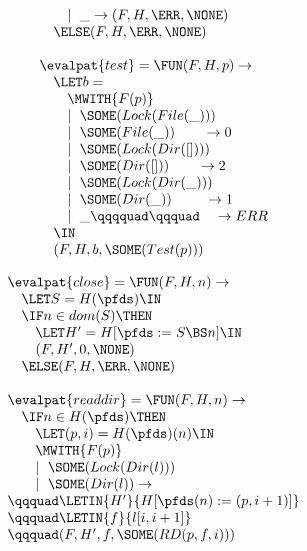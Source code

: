 \begin{figure*}
\begin{minipage}[t]{0.5\linewidth}
\begin{displaymath}
\begin{array}{l}
\qquad \mid~\_  \rightarrow (F,H,\ERR,\NONE) \\
\quad \ELSE (F,H,\ERR,\NONE) \\
\\
\evalpat{test} = \FUN (F,H,p) \rightarrow \\
\quad \LET b = \\
\qquad \MWITH{F(p)} \\
\qquad \mid~\SOME(Lock(File(\_))) \\
\qquad \mid~\SOME(File(\_)) \qquad \rightarrow 0 \\
\qquad \mid~\SOME(Lock(Dir([]))) \\
\qquad \mid~\SOME(Dir([])) \qquad \rightarrow 2 \\
\qquad \mid~\SOME(Lock(Dir(\_))) \\
\qquad \mid~\SOME(Dir(\_)) \qquad ~ \rightarrow 1 \\
\qquad  \mid~\_ \qqqquad \qqquad ~~~ \rightarrow ERR \\
\quad \IN \\
\quad (F,H,b,\SOME(Test(p)))
\end{array}
\end{displaymath}
\end{minipage}
\hfill
\begin{minipage}[t]{0.5\linewidth}
\begin{displaymath}
\begin{array}{l}
\evalpat{close} = \FUN (F,H,n) \rightarrow \\
\quad \LET S = H(\pfds) \IN \\
\quad \IF n \in dom(S) \THEN \\
\qquad \LET H' = H[\pfds := S \BS n] \IN \\
\qquad (F,H',0,\NONE) \\
\quad \ELSE (F,H,\ERR,\NONE) \\
\\
\evalpat{readdir} = \FUN (F,H,n) \rightarrow \\
\quad \IF n \in H(\pfds) \THEN \\
\qquad \LET (p,i) = H(\pfds)(n) \IN \\
\qquad \MWITH{F(p)} \\
\qquad \mid~\SOME(Lock(Dir(l))) \\
\qquad \mid~\SOME(Dir(l)) \rightarrow \\
\qqquad \LETIN{H'}{H[\pfds(n) := (p,i+1)]} \\
\qqquad \LETIN{f}{l[i,i+1]} \\
\qqquad (F,H',f,\SOME(RD(p,f,i))) \\

\end{array}
\end{displaymath}
\end{minipage}
\end{figure*}
